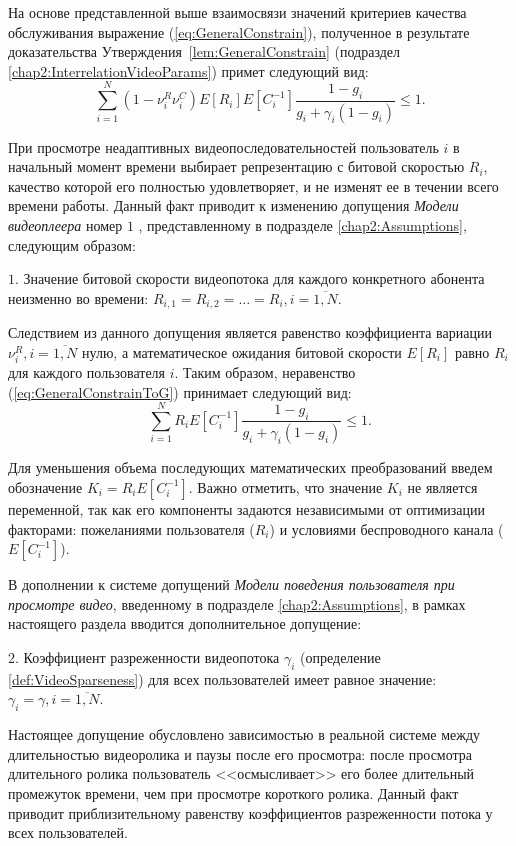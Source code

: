 На основе представленной выше взаимосвязи значений критериев качества обслуживания выражение (\ref{eq:GeneralConstrain}), полученное в результате доказательства Утверждения~\ref{lem:GeneralConstrain} (подраздел \ref{chap2:InterrelationVideoParams}) примет следующий вид:
\begin{equation}
	\label{eq:GeneralConstrainToG}
	\sum\limits_{i=1}^{N} {\left(1-\nu^R_i\nu^C_i\right)E[R_i]E[C_i^{-1}]\frac{1-g_i}{g_i + \gamma_i (1-g_i)}} \leq 1.
\end{equation}

При просмотре неадаптивных видеопоследовательностей пользователь $i$ в начальный момент времени выбирает репрезентацию с битовой скоростью $R_i$, качество которой его полностью удовлетворяет, и не изменят ее в течении всего времени работы. Данный факт приводит к изменению допущения \textit{Модели видеоплеера} номер $1$ , представленному в подразделе \ref{chap2:Assumptions}, следующим образом:

$1.$   Значение битовой скорости видеопотока для каждого конкретного абонента неизменно во времени: $R_{i,1} = R_{i,2} = \ldots = R_i, i=\overline{1,N}$.

Следствием из данного допущения является равенство коэффициента вариации $\nu^R_i, i=\overline{1,N}$ нулю, а математическое ожидания битовой скорости $E[R_i]$ равно $R_i$ для каждого пользователя $i$. Таким образом, неравенство (\ref{eq:GeneralConstrainToG}) принимает следующий вид:
$$\sum\limits_{i=1}^{N} {R_i E[C_i^{-1}]\frac{1-g_i}{g_i + \gamma_i (1-g_i)}} \leq 1.$$

Для уменьшения объема последующих математических преобразований введем обозначение $K_i = R_i E[C_i^{-1}]$. Важно отметить, что значение $K_i$ не является переменной, так как его компоненты задаются независимыми от оптимизации факторами: пожеланиями пользователя ($R_i$) и условиями беспроводного канала ($E[C_i^{-1}]$).

В дополнении к системе допущений \textit{Модели поведения пользователя при просмотре видео}, введенному в подразделе \ref{chap2:Assumptions}, в рамках настоящего раздела вводится дополнительное допущение:

$2.$   Коэффициент разреженности видеопотока $\gamma_i$ (определение \ref{def:VideoSparseness}) для всех пользователей имеет равное значение: $\gamma_i = \gamma, i=\overline{1,N}$.

Настоящее допущение обусловлено зависимостью в реальной системе между длительностью видеоролика и паузы после его просмотра: после просмотра длительного ролика пользователь <<осмысливает>> его более длительный промежуток времени, чем при просмотре короткого ролика. Данный факт приводит приблизительному равенству коэффициентов разреженности потока у всех пользователей.

